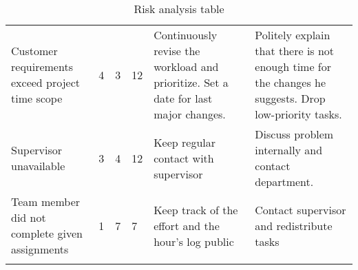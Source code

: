 \begin{longtable}{|p{3.6cm}!{\vrule width -1pt}l!{\vrule width -1pt}l!{\vrule width -1pt}l!{\vrule width -1pt}p{4.8cm}!{\vrule width -1pt}p{4.8cm}|}
Customer requirements exceed project time scope& 4 & 3 & 12 & Continuously revise the workload and prioritize. Set a date for last major changes. & Politely explain that there is not enough time for the changes he suggests. Drop low-priority tasks.\\
Supervisor unavailable & 3 & 4 & 12 & Keep regular contact with supervisor & Discuss problem internally and contact department.\\
Team member did not complete given assignments & 1 & 7 & 7 & Keep track of the effort and the hour's log public & Contact supervisor and redistribute tasks \\\hline
\caption{Risk analysis table}
\label{tab:risktable}
\end{longtable}

